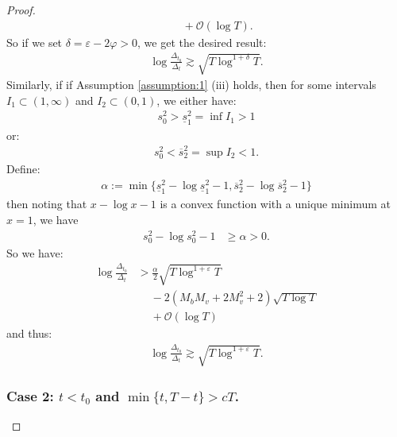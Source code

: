 \documentclass{article}
\begin{document}
\begin{proof}
\begin{align*}
    &\quad\: + \mathcal{O}(\log T).
\end{align*}
So if we set $\delta = \varepsilon - 2\varphi > 0$, we get the desired result:
\begin{align*}
    \log \frac{\Delta_{t_0}}{\Delta_t} \gtrsim \sqrt{T\log^{1+\delta} T}.
\end{align*}
Similarly, if if Assumption \ref{assumption:1} (iii) holds, then for some intervals $I_1 \subset (1,\infty)$ and $I_2 \subset (0,1)$, we either have:
\begin{align*}
   s_0^2 > \underline{s}^2_1 = \inf I_1  > 1
\end{align*}
or:
\begin{align*}
   s_0^2 < \overline{s}^2_2 = \sup I_2 < 1.
\end{align*}
Define:
\begin{align*}
    \alpha := \min\{\underline{s}_1^2 - \log \underline{s}_1^2 - 1, \overline{s}_2^2 - \log \overline{s}_2^2 - 1\}
\end{align*}
then noting that $x - \log x - 1$ is a convex function with a unique minimum at $x = 1$, we have
\begin{align*}
    s_0^2 - \log s_0^2 - 1 &\geq \alpha > 0.
\end{align*}
So we have:
\begin{align*}
    \log \frac{\Delta_{t_0}}{\Delta_t} &>  \frac{\alpha}{2}\sqrt{T\log^{1+\varepsilon} T} \\
    &\quad\: - 2 \left(M_bM_v +2M_v^2 + 2 \right) \sqrt{T \log T} \\
    &\quad\: + \mathcal{O}(\log T)
\end{align*}
and thus: 
\begin{align*}
    \log \frac{\Delta_{t_0}}{\Delta_t} \gtrsim \sqrt{T\log^{1+\varepsilon} T}.
\end{align*}

\subsubsection*{Case 2: $t < t_0$ and $\min\{t, T-t\} > cT$.}


\end{proof}
\end{document}
